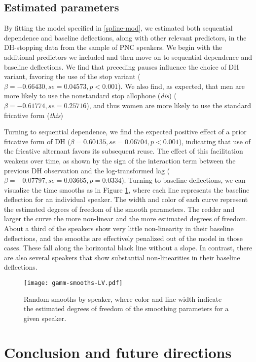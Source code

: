 \documentclass[12pt]{article}
\begin{document}
\subsection{Estimated parameters}

By fitting the model specified in \eqref{spline-mod}, we estimated both sequential dependence and baseline deflections, along with other relevant predictors, in the DH-stopping data from the sample of PNC speakers. We begin with the additional predictors we included and then move on to sequential dependence and baseline deflections. We find that preceding pauses influence the choice of DH variant, favoring the use of the stop variant ($\beta = -0.66430, se= 0.04573, p < 0.001$). We also find, as expected, that men are more likely to use the nonstandard stop allophone (\emph{dis}) ($\beta = -0.61774, se=0.25716$), and thus women are more likely to use the standard fricative form (\emph{this})

Turning to sequential dependence, we find the expected positive effect of a prior fricative form of DH ($\beta = 0.60135, se = 0.06704, p < 0.001$), indicating that use of the fricative alternant favors its subsequent reuse. The effect of this facilitation weakens over time, as shown by the sign of the interaction term between the previous DH observation and the log-transformed lag  ($\beta = -0.07797, se = 0.03665, p = 0.0334$).  Turning to baseline deflections, we can visualize the time smooths as in Figure \ref{wiggles}, where each line represents the baseline deflection for an individual speaker. The width and color of each curve represent the estimated degrees of freedom of the smooth parameters. The redder and larger the curve the more non-linear and the more estimated degrees of freedom. About a third of the speakers show very little non-linearity in their baseline deflections, and the smooths are effectively penalized out of the model in those cases. These fall along the horizontal black line without a slope. In contrast, there are also several speakers that show substantial non-linearities in their baseline deflections.


\begin{figure}
    \centering
    \texttt{[image: gamm-smooths-LV.pdf]}
    \caption{Random smooths by speaker, where color and line width indicate the estimated degrees of freedom of the smoothing parameters for a given speaker.} 
    \label{wiggles}
\end{figure}


\section{Conclusion and future directions} \label{discussion}
\end{document}
